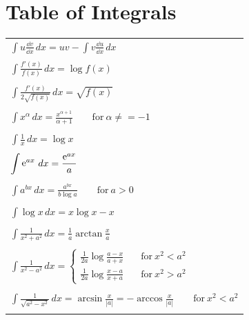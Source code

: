 \raggedbottom
\chapter{Table of Integrals}
\label{table_of_integrals}
\raggedbottom 

\setlongtables
\begin{longtable}{l}
  $\displaystyle \int u \frac{\dd v}{\dd x}\,d x = u v - \int v \frac{\dd u}{\dd x}\,d x$ \\
  \\
  $\displaystyle \int \frac{f'(x)}{f(x)}\,d x = \log f(x)$ \\
  \\
  $\displaystyle \int \frac{f'(x)}{2 \sqrt{f(x)}}\,d x = \sqrt{f(x)}$ \\
  \\
  $\displaystyle \int x^\alpha\,d x = \frac{x^{\alpha+1}}{\alpha+1} 
  \qquad \mathrm{for}\ \alpha \neq = -1$ \\
  \\
  $\displaystyle \int \frac{1}{x}\,d x = \log x$ \\
  \\
  $\displaystyle \int \mathop{\mathrm{e}}\nolimits^{a x}\,d x = \frac{\mathop{\mathrm{e}}\nolimits^{a x}}{a}$ \\
  \\
  $\displaystyle \int a^{b x}\,d x = \frac{a^{b x}}{b \log a} 
  \qquad \mathrm{for}\ a > 0$ \\
  \\
  $\displaystyle \int \log x\,d x = x \log x - x$ \\
  \\
  $\displaystyle \int \frac{1}{x^2 + a^2}\,d x 
  = \frac{1}{a} \arctan \frac{x}{a}$ \\
  \\
  $\displaystyle \int \frac{1}{x^2-a^2}\,d x = 
  \begin{cases}
    \frac{1}{2a} \log \frac{a-x}{a+x} \quad &\mathrm{for}\ x^2 < a^2 \\
    \frac{1}{2a} \log \frac{x-a}{x+a} \quad &\mathrm{for}\ x^2 > a^2
  \end{cases}$ \\
  \\
  $\displaystyle \int \frac{1}{\sqrt{a^2-x^2}}\,d x = \arcsin \frac{x}{|a|} 
  = - \arccos \frac{x}{|a|} \qquad \mathrm{for}\  x^2 < a^2$ \\
  \\

\end{longtable}
